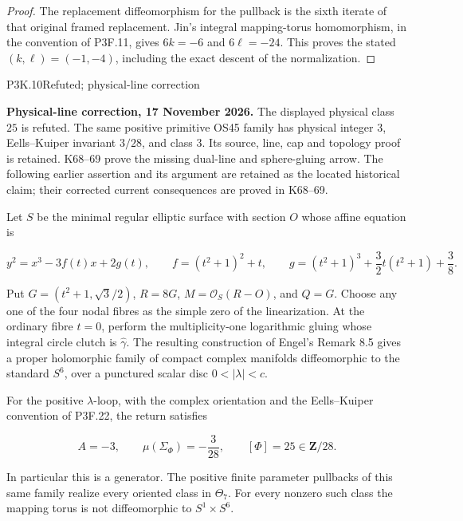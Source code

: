 \begin{proof}
The replacement diffeomorphism for the pullback is the sixth
iterate of that original framed replacement.  Jin's integral
mapping-torus homomorphism, in the convention of P3F.11, gives
\(6k=-6\) and \(6\ell=-24\).  This proves the stated
\((k,\ell)=(-1,-4)\), including the exact descent of the
normalization.
\end{proof}

\begin{statement}{P3K.10}{Refuted; physical-line correction}\par\noindent\textbf{Physical-line correction, 17 November 2026.} The displayed physical class \(25\) is refuted. The same positive primitive OS45 family has physical integer \(3\), Eells--Kuiper invariant \(3/28\), and class \(3\). Its source, line, cap and topology proof is retained. K68--69 prove the missing dual-line and sphere-gluing arrow. The following earlier assertion and its argument are retained as the located historical claim; their corrected current consequences are proved in K68--69.\medskip\par 
Let \(S\) be the minimal regular elliptic surface with section \(O\)
whose affine equation is

\[
 y^2=x^3-3f(t)x+2g(t),\qquad
 f=(t^2+1)^2+t,\qquad
 g=(t^2+1)^3+\frac32t(t^2+1)+\frac38.
\]

Put \(G=(t^2+1,\sqrt3/2)\), \(R=8G\),
\(M=\mathcal O_S(R-O)\), and \(Q=G\).  Choose any one of the four
nodal fibres as the simple zero of the linearization.  At the
ordinary fibre \(t=0\), perform the multiplicity-one logarithmic
gluing whose integral circle clutch is \(\widehat\gamma\).
The resulting construction of Engel's Remark 8.5 gives a proper
holomorphic family of compact complex manifolds diffeomorphic to
the standard \(S^6\), over a punctured scalar disc
\(0<|\lambda|<c\).

For the positive \(\lambda\)-loop, with the complex orientation and
the Eells--Kuiper convention of P3F.22, the return satisfies

\[
 A=-3,\qquad \mu(\Sigma_\Phi)=-\frac3{28},\qquad
 [\Phi]=25\in\mathbf Z/28.
\]

In particular this is a generator.  The positive finite parameter
pullbacks of this same family realize every oriented class in
\(\Theta_7\).  For every nonzero such class the mapping torus is
not diffeomorphic to \(S^1\times S^6\).
\end{statement}

